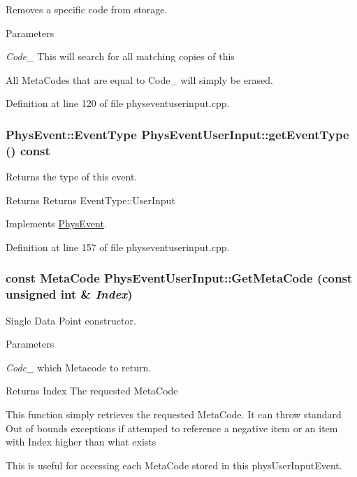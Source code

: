 Removes a specific code from storage. 
\begin{DoxyParams}{Parameters}
\item[{\em Code\_\-}]This will search for all matching copies of this\end{DoxyParams}
All MetaCodes that are equal to Code\_\- will simply be erased. 

Definition at line 120 of file physeventuserinput.cpp.\hypertarget{classPhysEventUserInput_a886530fc5d51bb30bb45a9d43011f32a}{
\subsubsection[{getEventType}]{\setlength{\rightskip}{0pt plus 5cm}PhysEvent::EventType PhysEventUserInput::getEventType () const}}
\label{dc/d0e/classPhysEventUserInput_a886530fc5d51bb30bb45a9d43011f32a}


Returns the type of this event. \begin{DoxyReturn}{Returns}
Returns EventType::UserInput 
\end{DoxyReturn}


Implements \hyperlink{classPhysEvent}{PhysEvent}.

Definition at line 157 of file physeventuserinput.cpp.\hypertarget{classPhysEventUserInput_aa564530c27f6983bb412e46c2c7ed086}{
\subsubsection[{GetMetaCode}]{\setlength{\rightskip}{0pt plus 5cm}const {\bf MetaCode} PhysEventUserInput::GetMetaCode (const unsigned int \& {\em Index})}}
\label{dc/d0e/classPhysEventUserInput_aa564530c27f6983bb412e46c2c7ed086}


Single Data Point constructor. 
\begin{DoxyParams}{Parameters}
\item[{\em Code\_\-}]which Metacode to return. \end{DoxyParams}
\begin{DoxyReturn}{Returns}
Index The requested MetaCode
\end{DoxyReturn}
This function simply retrieves the requested MetaCode. It can throw standard Out of bounds exceptions if attemped to reference a negative item or an item with Index higher than what exists \par
 This is useful for accessing each MetaCode stored in this physUserInputEvent. 

